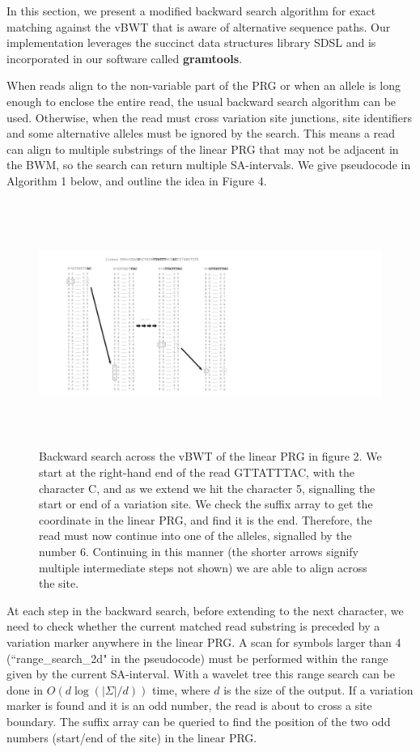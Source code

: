 \documentclass[runningheads,a4paper]{llncs}
\begin{document}
In this section, we present a modified backward search algorithm for exact matching against the vBWT that is aware of alternative sequence paths. Our implementation leverages the succinct data structures library SDSL \cite{gog} and is incorporated in our software called {\bf gramtools}. 


When reads align to the non-variable part of the PRG or when an allele is long enough to enclose the entire read, the usual backward search algorithm can be used. Otherwise, when the read must cross variation site junctions, site identifiers and some alternative alleles must be ignored by the search. This means a read can align to multiple substrings of the linear PRG that may not be adjacent in the BWM, so the search can return multiple SA-intervals. We give pseudocode in Algorithm 1 below, and outline the idea in Figure 4.

\begin{figure}
\centering
\includegraphics[height=8cm]{BWT.pdf}
\caption{Backward search across the vBWT of the linear PRG in figure 2.  We start at the right-hand end of the read GTTATTTAC, with the character C, and as we extend we hit the character 5, signalling the start or end of a variation site. We check the suffix array to get the coordinate in the linear PRG, and find it is the end. Therefore, the read must now continue into one of the alleles, signalled by the number 6. Continuing in this manner (the shorter arrows signify multiple intermediate steps not shown) we are able to align across the site.}
\label{example}
\end{figure}

At each step in the backward search, before extending to the next character, we need to check whether the current matched read substring is preceded by a variation marker anywhere in the linear PRG. A scan for symbols larger than 4 (``range\_search\_2d" in the pseudocode) must be performed within the range given by the current SA-interval. With a wavelet tree this range search can be done in $O(d\log(|\Sigma|/d))$ time, where $d$ is the size of the output. If a variation marker is found and it is an odd number, the read is about to cross a site boundary. The suffix array can be queried to find the position of the two odd numbers (start/end of the site) in the linear PRG.
\end{document}
